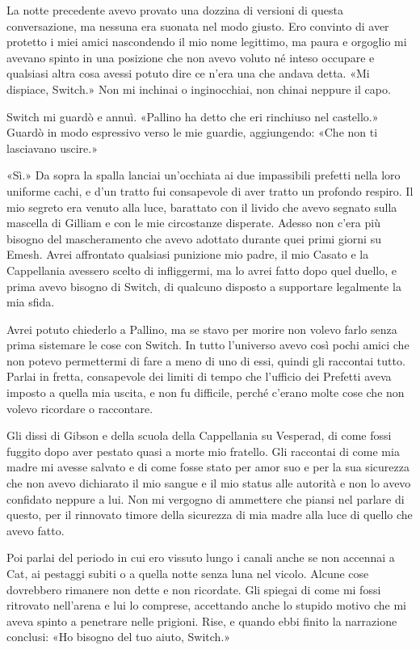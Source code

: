 La notte precedente avevo provato una dozzina di versioni di questa
conversazione, ma nessuna era suonata nel modo giusto. Ero convinto di
aver protetto i miei amici nascondendo il mio nome legittimo, ma paura e
orgoglio mi avevano spinto in una posizione che non avevo voluto né
inteso occupare e qualsiasi altra cosa avessi potuto dire ce n'era una
che andava \emph{} detta. «Mi dispiace, Switch.» Non mi inchinai o
inginocchiai, non chinai neppure il capo.

Switch mi guardò e annuì. «Pallino ha detto che eri rinchiuso nel
castello.» Guardò in modo espressivo verso le mie guardie, aggiungendo:
«Che non ti lasciavano uscire.»

«Sì.» Da sopra la spalla lanciai un'occhiata ai due impassibili prefetti
nella loro uniforme cachi, e d'un tratto fui consapevole di aver tratto
un profondo respiro. Il mio segreto era venuto alla luce, barattato con
il livido che avevo segnato sulla mascella di Gilliam e con le mie
circostanze disperate. Adesso non c'era più bisogno del mascheramento
che avevo adottato durante quei primi giorni su Emesh. Avrei affrontato
qualsiasi punizione mio padre, il mio Casato e la Cappellania avessero
scelto di infliggermi, ma lo avrei fatto dopo quel duello, e prima avevo
bisogno di Switch, di qualcuno disposto a supportare legalmente la mia
sfida.

Avrei potuto chiederlo a Pallino, ma se stavo per morire non volevo
farlo senza prima sistemare le cose con Switch. In tutto {l'universo}
avevo così pochi amici che non potevo permettermi di fare a meno di uno
di essi, quindi gli raccontai tutto. Parlai in fretta, consapevole dei
limiti di tempo che l'ufficio dei Prefetti aveva {imposto} a quella mia
uscita, e non fu difficile, perché c'erano molte cose che non volevo
ricordare o raccontare.

Gli dissi di Gibson e della scuola della Cappellania su Vesperad, di
come fossi fuggito dopo aver pestato quasi a morte mio fratello. Gli
raccontai di come mia madre mi avesse salvato e di come fosse stato per
amor suo e per la sua sicurezza che non avevo dichiarato il mio sangue e
il mio status alle autorità e non lo avevo confidato neppure a lui. Non
mi vergogno di ammettere che piansi nel parlare di questo, per il
rinnovato timore della sicurezza di mia madre alla luce di quello che
avevo fatto.

Poi parlai del periodo in cui ero vissuto lungo i canali anche se non
accennai a Cat, ai pestaggi subiti o a quella notte senza luna nel
vicolo. Alcune cose dovrebbero rimanere non dette e non ricordate. Gli
spiegai di come mi fossi ritrovato nell'arena e lui lo comprese,
accettando anche lo stupido motivo che mi aveva spinto a penetrare nelle
prigioni. Rise, e quando ebbi finito la narrazione conclusi: «Ho bisogno
del tuo aiuto, Switch.»

